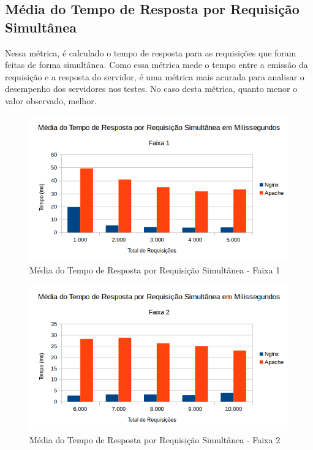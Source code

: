 \subsection{Média do Tempo de Resposta por Requisição Simultânea}
Nessa métrica, é calculado o tempo de resposta para as requisições que foram 
feitas de forma simultânea. Como essa métrica mede o tempo entre a emissão da 
requisição e a resposta do servidor, é uma métrica mais acurada para analisar o 
desempenho dos servidores nos testes. No caso desta métrica, quanto menor o 
valor observado, melhor.
\begin{figure}[H]
	\centering
	\includegraphics[width=1\linewidth]{graficos/grafico5-f1} 
	\caption{Média do Tempo de Resposta por Requisição Simultânea - Faixa 1}
	\label{fig:grafico5-f1}
\end{figure}
\begin{figure}[H]
	\centering
	\includegraphics[width=1\linewidth]{graficos/grafico5-f2} 
	\caption{Média do Tempo de Resposta por Requisição Simultânea - Faixa 2}
	\label{fig:grafico5-f2}
\end{figure}
